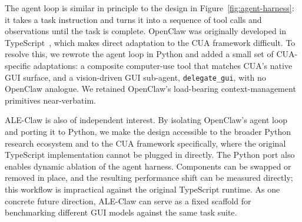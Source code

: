 The agent loop is similar in principle to the design in Figure~\ref{fig:agent-harness}: it takes a task instruction and turns it into a sequence of tool calls and observations until the task is complete.
OpenClaw was originally developed in TypeScript~\citep{openclaw2026agent}, which makes direct adaptation to the CUA framework difficult.
To resolve this, we rewrote the agent loop in Python and added a small set of CUA-specific adaptations: a composite computer-use tool that matches CUA's native GUI surface, and a vision-driven GUI sub-agent, \texttt{delegate\_gui}, with no OpenClaw analogue.
We retained OpenClaw's load-bearing context-management primitives near-verbatim.

ALE-Claw is also of independent interest.
By isolating OpenClaw's agent loop and porting it to Python, we make the design accessible to the broader Python research ecosystem and to the CUA framework specifically, where the original TypeScript implementation cannot be plugged in directly.
The Python port also enables dynamic ablation of the agent harness.
Components can be swapped or removed in place, and the resulting performance shift can be measured directly; this workflow is impractical against the original TypeScript runtime.
As one concrete future direction, ALE-Claw can serve as a fixed scaffold for benchmarking different GUI models against the same task suite.
